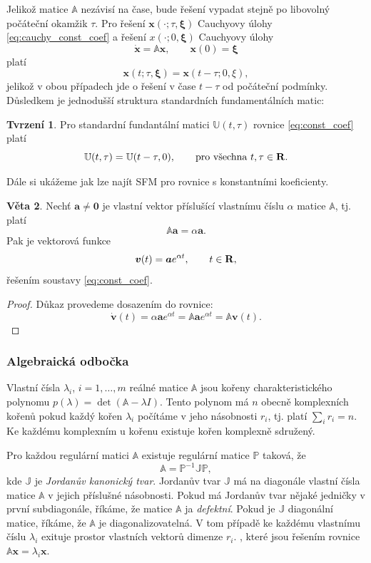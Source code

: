 \documentclass[a4paper, 12pt]{book}
\theoremstyle{definition}
\newtheorem{theorem}{Věta}[section]
\newtheorem{proposition}[theorem]{Tvrzení}
\def\Real{{\rm\bf R}}
\def\vc#1{\mathbf{\boldsymbol{#1}}}     %
\def\tn#1{{\mathbb{#1}}}    %
\def\df#1{\emph{#1}}
\begin{document}
Jelikož matice $\tn A$ nezávisí na čase, bude řešení vypadat stejně po libovolný počáteční okamžik $\tau$. Pro řešení $\vc x(\cdot;\tau, \vc \xi)$ 
Cauchyovy úlohy \eqref{eq:cauchy_const_coef} a řešení $x(\cdot; 0, \vc \xi)$ Cauchyovy úlohy
    \begin{equation}
        \dot{\vc x} = {\tn A}\vc x,\qquad \vc x(0)=\vc\xi
    \end{equation}
platí
\[
   \vc x(t;\tau, \vc \xi) = \vc x(t - \tau; 0, \xi),
\]
jelikož v obou případech jde o řešení v čase $t - \tau$ od počáteční podmínky. Důsledkem je jednodušší struktura standardních fundamentálních matic:
\begin{proposition}
Pro standardní fundantální matici $\tn U(t,\tau)$ rovnice \eqref{eq:const_coef}
platí
\[
    {\tn U}(t,\tau)={\tn U}(t-\tau,0),\qquad \text{pro všechna }t,\tau\in \Real.
\]
\end{proposition}

Dále si ukážeme jak lze najít SFM pro rovnice s konstantními koeficienty. 
\begin{theorem}
Nechť $\vc a\ne \vc 0$ je vlastní vektor příslušící vlastnímu číslu $\alpha$ matice $\tn A$, tj. platí
\[
  \tn A \vc a = \alpha \vc a.
\]
Pak je vektorová funkce
\begin{equation}
\vc v(t)=\vc a e^{\alpha t},\qquad      t\in \Real,
\end{equation}
řešením soustavy \eqref{eq:const_coef}.
\end{theorem}
\begin{proof}
Důkaz provedeme dosazením do rovnice:
\[
  \dot{\vc v}(t) = \alpha \vc a e^{\alpha t} = \tn A \vc a e^{\alpha t} = \tn A \vc v(t).
\]
\end{proof}

\subsubsection{Algebraická odbočka}
Vlastní čísla $\lambda_i$, $i=1,\dots, m$ reálné matice $\tn A$ jsou kořeny charakteristického polynomu $p(\lambda) = \det(\tn A-\lambda I)$. 
Tento polynom má $n$ obecně komplexních kořenů pokud každý kořen $\lambda_i$ počítáme v jeho násobnosti $r_i$, tj. platí $\sum_i r_i = n$. 
Ke každému komplexním u kořenu existuje kořen komplexně sdružený. 

Pro každou regulární matici $\tn A$ existuje regulární matice $\tn P$ taková, že
\[
   \tn A = \tn P^{-1} \tn J \tn P,
\]
kde $\tn J$ je \df{Jordanův kanonický tvar}. Jordanův tvar $\tn J$ má na diagonále vlastní čísla matice $\tn A$ v jejich příslušné násobnosti.
Pokud má Jordanův tvar nějaké jedničky v první subdiagonále, říkáme, že matice $\tn A$ ja \df{defektní}. Pokud je $\tn J$ diagonální matice, 
říkáme, že $\tn A$ je diagonalizovatelná. V tom případě ke každému vlastnímu číslu $\lambda_i$ exituje prostor  vlastních vektorů dimenze $r_i$.
, které jsou řešením rovnice $\tn A\vc x = \lambda_i \vc x$. 
\end{document}
